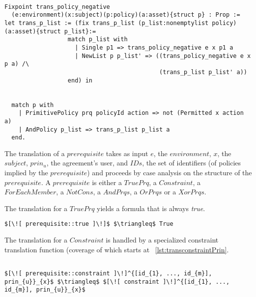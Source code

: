 \begin{lstlisting}

Fixpoint trans_policy_negative
  (e:environment)(x:subject)(p:policy)(a:asset){struct p} : Prop :=
let trans_p_list := (fix trans_p_list (p_list:nonemptylist policy)(a:asset){struct p_list}:=
                  match p_list with
                    | Single p1 => trans_policy_negative e x p1 a
                    | NewList p p_list' => ((trans_policy_negative e x p a) /\ 
                                            (trans_p_list p_list' a))
                  end) in


  match p with
    | PrimitivePolicy prq policyId action => not (Permitted x action a)
    | AndPolicy p_list => trans_p_list p_list a
  end.

\end{lstlisting}

The translation of a $prerequisite$ takes as input $e$, the $environment$, $x$, the $subject$, $prin_{u}$, the agreement's user, and $IDs$, the set of identifiers (of policies implied by the $prerequisite$) and proceeds by case analysis on the structure of the $prerequisite$. A $prerequisite$ is either a $TruePrq$, a $Constraint$, a $ForEachMember$, a $NotCons$, a $AndPrqs$, a $OrPrqs$ or a $XorPrqs$.

The translation for a $TruePrq$ yields a formula that is always \emph{true}.

\lstset{mathescape, language=AST}  
\begin{lstlisting}[frame=single, caption={Prerequisite Translation {$\colon$} Always True Prerequisite},label={lst:transpreRequisiteTruePrq}]
	$[\![ prerequisite::true ]\!]$ $\triangleq$ True
\end{lstlisting}

The translation for a $Constraint$ is handled by a specialized constraint translation function (coverage of which starts at ~\ref{lst:transconstraintPrin}.

\lstset{mathescape, language=AST}  
\begin{lstlisting}[frame=single, caption={Prerequisite Translation {$\colon$} Constraint},label={lst:transpreRequisiteConstraint}]

$[\![ prerequisite::constraint ]\!]^{[id_{1}, ..., id_{m}], prin_{u}}_{x}$ $\triangleq$ $[\![ constraint ]\!]^{[id_{1}, ..., id_{m}], prin_{u}}_{x}$ 
\end{lstlisting}

